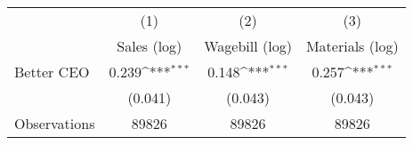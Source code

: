 {
\def\sym#1{\ifmmode^{#1}\else\(^{#1}\)\fi}
\begin{tabular}{l*{3}{c}}
\hline\hline
                    &\multicolumn{1}{c}{(1)}&\multicolumn{1}{c}{(2)}&\multicolumn{1}{c}{(3)}\\
                    &\multicolumn{1}{c}{Sales (log)}&\multicolumn{1}{c}{Wagebill (log)}&\multicolumn{1}{c}{Materials (log)}\\
\hline
Better CEO          &       0.239\sym{***}&       0.148\sym{***}&       0.257\sym{***}\\
                    &     (0.041)         &     (0.043)         &     (0.043)         \\
\hline
Observations        &       89826         &       89826         &       89826         \\
\hline\hline
\end{tabular}
}

